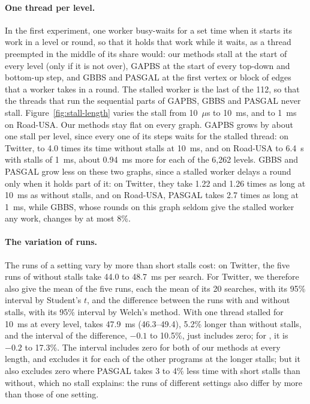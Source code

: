 \paragraph{One thread per level.} In the first experiment, one worker busy-waits for a set time when it starts its work in a level or round, so that it holds that work while it waits, as a thread preempted in the middle of its share would: our methods stall at the start of every level (\wfdomem only if it is not over), GAPBS at the start of every top-down and bottom-up step, and GBBS and PASGAL at the first vertex or block of edges that a worker takes in a round. The stalled worker is the last of the 112, so that the threads that run the sequential parts of GAPBS, GBBS and PASGAL never stall. Figure~\ref{fig:stall-length} varies the stall from 10~$\mu$s to 10~ms, and to 1~ms on Road-USA. Our methods stay flat on every graph. GAPBS grows by about one stall per level, since every one of its steps waits for the stalled thread: on Twitter, to 4.0 times its time without stalls at 10~ms, and on Road-USA to 6.4~s with stalls of 1~ms, about 0.94~ms more for each of the 6,262 levels. GBBS and PASGAL grow less on these two graphs, since a stalled worker delays a round only when it holds part of it: on Twitter, they take 1.22 and 1.26 times as long at 10~ms as without stalls, and on Road-USA, PASGAL takes 2.7 times as long at 1~ms, while GBBS, whose rounds on this graph seldom give the stalled worker any work, changes by at most 8\%.

\paragraph{The variation of runs.} The runs of a setting vary by more than short stalls cost: on Twitter, the five runs of \wfdo without stalls take 44.0 to 48.7~ms per search. For Twitter, we therefore also give the mean of the five runs, each the mean of its 20 searches, with its 95\% interval by Student's $t$, and the difference between the runs with and without stalls, with its 95\% interval by Welch's method. With one thread stalled for 10~ms at every level, \wfdo takes 47.9~ms (46.3--49.4), 5.2\% longer than without stalls, and the interval of the difference, $-0.1$ to 10.5\%, just includes zero; for \wfdomem, it is $-0.2$ to 17.3\%. The interval includes zero for both of our methods at every length, and excludes it for each of the other programs at the longer stalls; but it also excludes zero where PASGAL takes 3 to 4\% less time with short stalls than without, which no stall explains: the runs of different settings also differ by more than those of one setting.

